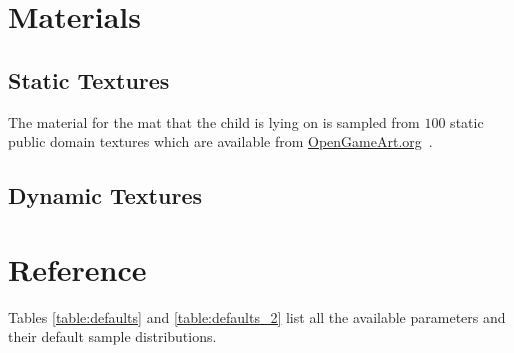 \documentclass{article}
\begin{document}
\section{Materials}
\subsection{Static Textures}
The material for the mat that the child is lying on is sampled from $100$ static public domain textures which are available from \url{OpenGameArt.org}~\cite{100_seamless_textures}.

\subsection{Dynamic Textures}



\section{Reference}

Tables \ref{table:defaults} and \ref{table:defaults_2} list all the available parameters and their default sample distributions.
\end{document}
